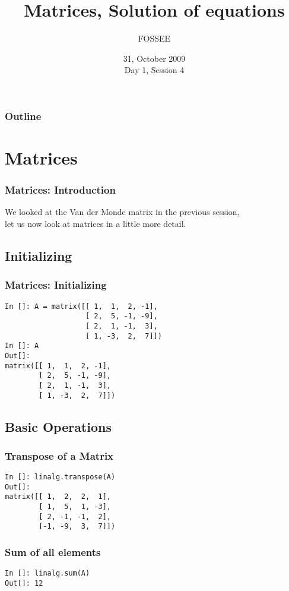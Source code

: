 \documentclass[14pt,compress]{beamer}
\title[Basic Python]{Matrices, Solution of equations}
\author[FOSSEE] {FOSSEE}
\institute[IIT Bombay] {Department of Aerospace Engineering\\IIT Bombay}
\date[] {31, October 2009\\Day 1, Session 4}
\begin{document}
\begin{frame}
  \titlepage
\end{frame}

\begin{frame}
  \frametitle{Outline}
  \tableofcontents
\end{frame}

\section{Matrices}

\begin{frame}
\frametitle{Matrices: Introduction}
We looked at the Van der Monde matrix in the previous session,\\ 
let us now look at matrices in a little more detail.
\end{frame}

\subsection{Initializing}
\begin{frame}[fragile]
\frametitle{Matrices: Initializing}
\begin{lstlisting}
In []: A = matrix([[ 1,  1,  2, -1],
                   [ 2,  5, -1, -9],
                   [ 2,  1, -1,  3],
                   [ 1, -3,  2,  7]])
In []: A
Out[]: 
matrix([[ 1,  1,  2, -1],
        [ 2,  5, -1, -9],
        [ 2,  1, -1,  3],
        [ 1, -3,  2,  7]])
\end{lstlisting}
\end{frame}

\subsection{Basic Operations}

\begin{frame}[fragile]
\frametitle{Transpose of a Matrix}
\begin{lstlisting}
In []: linalg.transpose(A)
Out[]:
matrix([[ 1,  2,  2,  1],
        [ 1,  5,  1, -3],
        [ 2, -1, -1,  2],
        [-1, -9,  3,  7]])
\end{lstlisting}
\end{frame}

\begin{frame}[fragile]
  \frametitle{Sum of all elements}
  \begin{lstlisting}
In []: linalg.sum(A)
Out[]: 12
  \end{lstlisting}
\end{frame}
\end{document}
